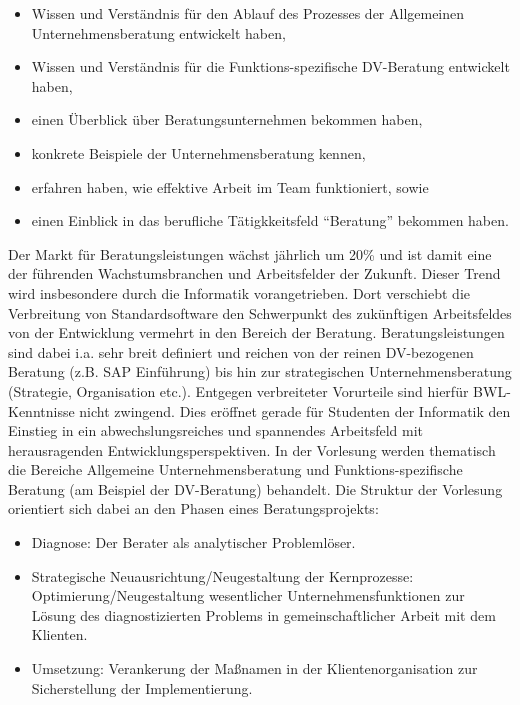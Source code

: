\begin{course}
\begin{learningoutcomes}
 \begin{itemize}\item Wissen und Verständnis für den Ablauf des Prozesses der Allgemeinen Unternehmensberatung entwickelt haben,  \item Wissen und Verständnis für die Funktions-spezifische DV-Beratung entwickelt haben,  \item einen Überblick über Beratungsunternehmen bekommen haben,  \item konkrete Beispiele der Unternehmensberatung kennen,  \item erfahren haben, wie effektive Arbeit im Team funktioniert, sowie  \item einen Einblick in das berufliche Tätigkkeitsfeld “Beratung” bekommen haben.  \end{itemize}
\end{learningoutcomes}

\begin{content}
Der Markt für Beratungsleistungen wächst jährlich um 20\% und ist damit eine der führenden Wachstumsbranchen und Arbeitsfelder der Zukunft. Dieser Trend wird insbesondere durch die Informatik vorangetrieben. Dort verschiebt die Verbreitung von Standardsoftware den Schwerpunkt des zukünftigen Arbeitsfeldes von der Entwicklung vermehrt in den Bereich der Beratung. Beratungsleistungen sind dabei i.a. sehr breit definiert und reichen von der reinen DV-bezogenen Beratung (z.B. SAP Einführung) bis hin zur strategischen Unternehmensberatung (Strategie, Organisation etc.). Entgegen verbreiteter Vorurteile sind hierfür BWL-Kenntnisse nicht zwingend. Dies eröffnet gerade für Studenten der Informatik den Einstieg in ein abwechslungsreiches und spannendes Arbeitsfeld mit herausragenden Entwicklungsperspektiven.\newline
\newline
In der Vorlesung werden thematisch die Bereiche Allgemeine Unternehmensberatung und Funktions-spezifische Beratung (am Beispiel der DV-Beratung) behandelt. Die Struktur der Vorlesung orientiert sich dabei an den Phasen eines Beratungsprojekts:

 \begin{itemize}\item Diagnose: Der Berater als analytischer Problemlöser.  \item Strategische Neuausrichtung/Neugestaltung der Kernprozesse: Optimierung/Neugestaltung wesentlicher Unternehmensfunktionen zur Lösung des diagnostizierten Problems in gemeinschaftlicher Arbeit mit dem Klienten.  \item Umsetzung: Verankerung der Maßnamen in der Klientenorganisation zur Sicherstellung der Implementierung.  \end{itemize}


\end{content}
\end{course}
